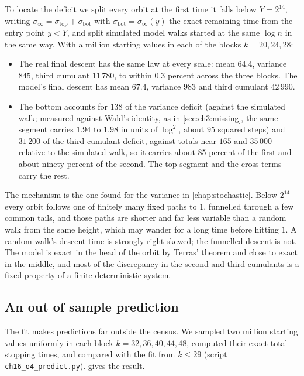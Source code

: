 To locate the deficit we split every orbit at the first time it falls below
$Y=2^{14}$, writing $\sigma_\infty=\sigma_{\mathrm{top}}+\sigma_{\mathrm{bot}}$ with
$\sigma_{\mathrm{bot}}=\sigma_\infty(y)$ the exact remaining time from the entry point
$y<Y$, and split simulated model walks started at the same $\log n$ in the same
way. With a million starting values in each of the blocks $k=20,24,28$:

\begin{itemize}[leftmargin=1.5em]
\item The real final descent has the same law at every scale: mean $64.4$,
  variance $845$, third cumulant $11\,780$, to within $0.3$ percent across the
  three blocks. The model's final descent has mean $67.4$, variance $983$ and
  third cumulant $42\,990$.
\item The bottom accounts for $138$ of the variance deficit (against the simulated walk; measured against Wald's identity, as in \cref{sec:ch3:missing}, the same segment carries $1.94$ to $1.98$ in units of $\log^2$, about $95$ squared steps) and $31\,200$ of the
  third cumulant deficit, against totals near $165$ and $35\,000$ relative to the
  simulated walk, so it carries about 85 percent of the first and about ninety percent of
  the second. The top segment and the cross terms carry the rest.
\end{itemize}

The mechanism is the one found for the variance in \cref{chap:stochastic}.
Below $2^{14}$ every orbit follows one of finitely many fixed paths to $1$,
funnelled through a few common tails, and those paths are shorter and far less
variable than a random walk from the same height, which may wander for a long
time before hitting $1$. A random walk's descent time is strongly right skewed;
the funnelled descent is not. The model is exact in the head of the orbit by
Terras' theorem and close to exact in the middle, and most of the discrepancy
in the second and third cumulants is a fixed property of a finite deterministic
system.

\subsection{An out of sample prediction}

The fit makes predictions far outside the census. We sampled two million
starting values uniformly in each block $k=32,36,40,44,48$, computed their
exact total stopping times, and compared with the fit from $k\le29$ (script
\texttt{ch16\_o4\_predict.py}).  gives the result.

